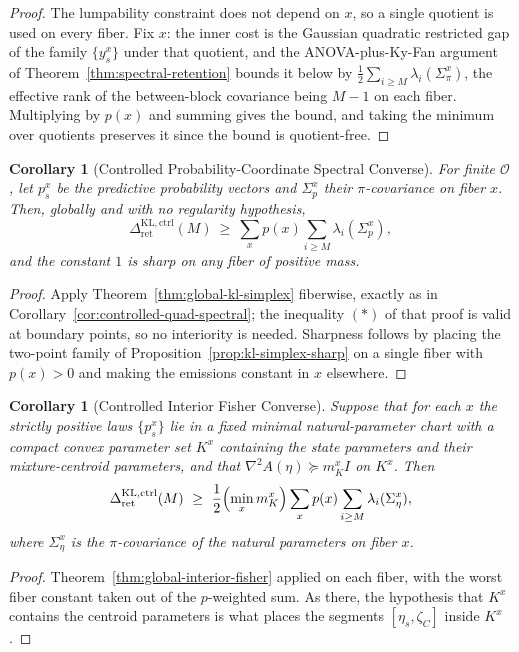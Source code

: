 \documentclass[12pt]{article}
\newtheorem{corollary}[theorem]{Corollary}
\theoremstyle{definition}
\newcommand{\RetKLc}{\Delta_{\mathrm{ret}}^{\mathrm{KL,ctrl}}}
\begin{document}
\begin{proof}
The lumpability constraint does not depend on $x$, so a single quotient is used
on every fiber.  Fix $x$: the inner cost is the Gaussian quadratic restricted
gap of the family $\{y_s^x\}$ under that quotient, and the ANOVA-plus-Ky-Fan
argument of Theorem~\ref{thm:spectral-retention} bounds it below by
$\tfrac12\sum_{i\ge M}\lambda_i(\Sigma_\pi^x)$, the effective rank of the
between-block covariance being $M-1$ on each fiber.  Multiplying by $p(x)$ and
summing gives the bound, and taking the minimum over quotients preserves it
since the bound is quotient-free.
\end{proof}

\begin{corollary}[Controlled Probability-Coordinate Spectral Converse]
\label{cor:controlled-simplex-spectral}
For finite $\mathcal O$, let $p_s^x$ be the predictive probability vectors and
$\Sigma_p^x$ their $\pi$-covariance on fiber $x$.  Then, globally and with no
regularity hypothesis,
\[
\RetKLc(M)
\ \ge\
\sum_xp(x)\sum_{i\ge M}\lambda_i(\Sigma_p^x),
\]
and the constant $1$ is sharp on any fiber of positive mass.
\end{corollary}

\begin{proof}
Apply Theorem~\ref{thm:global-kl-simplex} fiberwise, exactly as in
Corollary~\ref{cor:controlled-quad-spectral}; the inequality $(*)$ of that
proof is valid at boundary points, so no interiority is needed.  Sharpness
follows by placing the two-point family of
Proposition~\ref{prop:kl-simplex-sharp} on a single fiber with $p(x)>0$ and
making the emissions constant in $x$ elsewhere.
\end{proof}

\begin{corollary}[Controlled Interior Fisher Converse]
\label{cor:controlled-fisher}
Suppose that for each $x$ the strictly positive laws $\{p_s^x\}$ lie in a fixed
minimal natural-parameter chart with a compact convex parameter set $K^x$
containing the state parameters \emph{and} their mixture-centroid parameters,
and that $\nabla^2A(\eta)\succeq m_{K}^{x}I$ on $K^x$.  Then
\[
\RetKLc(M)
\ \ge\
\frac12\Bigl(\min_xm_{K}^{x}\Bigr)\sum_xp(x)\sum_{i\ge M}\lambda_i(\Sigma_\eta^x),
\]
where $\Sigma_\eta^x$ is the $\pi$-covariance of the natural parameters on
fiber $x$.
\end{corollary}

\begin{proof}
Theorem~\ref{thm:global-interior-fisher} applied on each fiber, with the worst
fiber constant taken out of the $p$-weighted sum.  As there, the hypothesis
that $K^x$ contains the centroid parameters is what places the segments
$[\eta_s,\zeta_C]$ inside $K^x$.
\end{proof}
\end{document}
